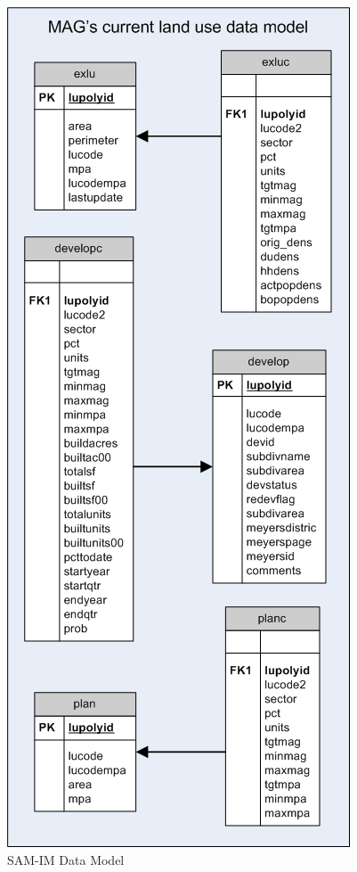 \begin{figure}[h]
\begin{center}
\includegraphics[scale=0.4]{../../datamodel/SAM-IM_data_model_diagram.png}
\caption{SAM-IM Data Model}
\label{figSAMDataModel}
\end{center}
\end{figure}


